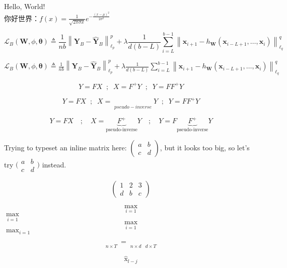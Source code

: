 \documentclass[UTF8]{ctexart}
\begin{document}
	Hello, World!\\
	你好世界：$f(x)=\frac{1}{\sqrt{2 \pi \sigma x}} e^{-\frac{(x-\mu)^{2}}{2 \sigma^{2}}}$
	
$$\mathcal{L}_{B}(\mathbf{W}, \phi, \boldsymbol{\theta}) \triangleq \frac{1}{n b}\left\|\mathbf{Y}_{B}-\hat{\mathbf{Y}}_{B}\right\|_{\ell_{p}}^{p}+\lambda \frac{1}{d(b-L)} \sum_{i=L}^{b-1}\left\|\mathbf{x}_{i+1}-h_{\mathbf{W}}\left(\mathbf{x}_{i-L+1}, \ldots, \mathbf{x}_{i}\right)\right\|_{\ell_{q}}^{q}$$

$\mathcal{L}_{B}(\mathbf{W}, \phi, \boldsymbol{\theta}) \triangleq \frac{1}{n b}\left\|\mathbf{Y}_{B}-\hat{\mathbf{Y}}_{B}\right\|_{\ell_{p}}^{p}+\lambda \frac{1}{d(b-L)} \sum_{i=L}^{b-1}\left\|\mathbf{x}_{i+1}-h_{\mathbf{W}}\left(\mathbf{x}_{i-L+1}, \ldots, \mathbf{x}_{i}\right)\right\|_{\ell_{q}}^{q}$

$$ Y=FX \;\; ; \;\; X=F^+Y \;\; ; \;\; Y=FF^+Y $$

$$ Y=FX \;\; ; \;\; 
X=\mathop{\underbrace{F^+}}\limits_{pseudo-inverse} Y \;\; ; \;\; 
Y=FF^+Y $$

$$Y=FX\quad;\quad
X=\underbrace{F^{+}}_{\text{pseudo-inverse}}Y\quad;\quad
Y=F \underbrace{F^{+}}_{\text{pseudo-inverse}} Y$$



Trying to typeset an inline matrix here:
$\begin{pmatrix}
	a & b\\ 
	c & d
\end{pmatrix}$, but it looks too big, so let's try 
$\big(\begin{smallmatrix}
	a & b\\
	c & d
\end{smallmatrix}\big)$ instead.

$$\begin{pmatrix}
	1 & 2 & 3\\
	d & b & c
\end{pmatrix}$$


$$ \max \limits_{i=1} $$
$ \max \limits_{i=1} $
$$ \max_{i=1} $$
$ \max_{i=1} $

$$
\mathop{\underbrace{Y}}
\limits_{n \times T}
= \mathop{\underbrace{F}}
\limits_{n \times d}
\mathop{\underbrace{X}}
\limits_{d \times T}
$$

$$\hat{\mathop{x}}_{l-j}$$
\end{document}

